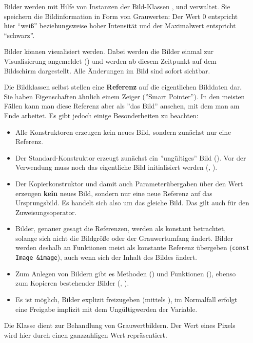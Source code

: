 
Bilder werden mit Hilfe von Instanzen der Bild-Klassen , 
 und  verwaltet. Sie speichern 
die Bildinformation
in Form von Grauwerten: Der Wert 0 entspricht hier ``weiß'' 
beziehungsweise hoher Intensität und der Maximalwert 
entspricht ``schwarz''.

Bilder können visualisiert werden. Dabei werden die Bilder einmal zur 
Visualisierung angemeldet () und werden ab diesem Zeitpunkt 
auf dem Bildschirm dargestellt. Alle Änderungen im Bild sind sofort
sichtbar.

Die Bildklassen selbst stellen eine {\bf Referenz} auf die eigentlichen 
Bilddaten dar. Sie haben Eigenschaften ähnlich einem Zeiger (''Smart Pointer''). 
In den meisten Fällen kann man diese Referenz aber als ''das Bild'' ansehen, 
mit dem man am Ende arbeitet. Es gibt jedoch einige Besonderheiten zu beachten:
\begin{itemize}
\item Alle Konstruktoren erzeugen kein neues Bild, sondern zunächst nur eine 
Referenz. 
\item Der Standard-Konstruktor erzeugt zunächst ein ''ungültiges''
Bild (). Vor der Verwendung muss noch das 
eigentliche Bild initialisiert werden (,  ).
\item Der Kopierkonstruktor und damit auch Parameterübergaben über den Wert 
erzeugen {\bf kein} neues Bild, sondern nur eine neue Referenz auf das 
Ursprungsbild. Es handelt sich also um das gleiche Bild. Das gilt auch für den 
Zuweisungsoperator.
\item Bilder, genauer gesagt die Referenzen,  werden als konstant 
betrachtet, solange sich nicht die Bildgröße oder der Grauwertumfang 
ändert. Bilder werden deshalb an Funktionen meist als konstante Referenz 
übergeben (\verb+const Image &image+), auch wenn sich der Inhalt des Bildes
ändert.
\item Zum Anlegen von Bildern gibt es Methoden () 
und Funktionen (), ebenso zum Kopieren bestehender Bilder 
(, ).
\item Es ist möglich, Bilder explizit freizugeben (mittels ), 
im Normalfall erfolgt eine Freigabe implizit mit dem Ungültigwerden 
der Variable. 
\end{itemize}

Die Klasse  dient zur Behandlung von Grauwertbildern. Der 
Wert eines Pixels wird hier durch einen ganzzahligen Wert repräsentiert. 

